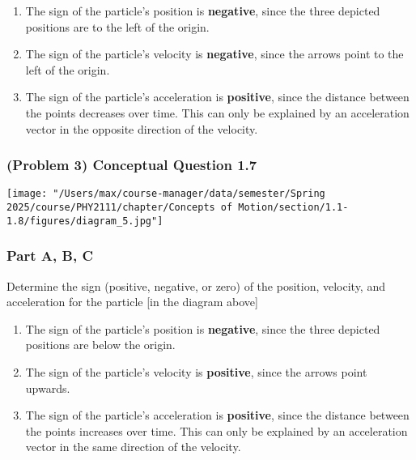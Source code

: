 \vspace{1em}

\begin{solution}
	\begin{enumerate}
		\item The sign of the particle's position is \textbf{negative}, since the three depicted positions are to the left of the origin.
		\item The sign of the particle's velocity is \textbf{negative}, since the arrows point to the left of the origin.
		\item The sign of the particle's acceleration is \textbf{positive}, since the distance between the points decreases over time. This can only be explained by an acceleration vector in the opposite direction of the velocity.
	\end{enumerate}
\end{solution}

\newpage

\subsubsection{(Problem 3) Conceptual Question 1.7}

\begin{center}
	\texttt{[image: "/Users/max/course-manager/data/semester/Spring 2025/course/PHY2111/chapter/Concepts of Motion/section/1.1-1.8/figures/diagram\_5.jpg"]}
\end{center}

\subsubsection{Part A, B, C}
Determine the sign (positive, negative, or zero) of the position, velocity, and acceleration for the particle [in the diagram above]

\vspace{1em}

\begin{solution}
	\begin{enumerate}
		\item The sign of the particle's position is \textbf{negative}, since the three depicted positions are below the origin.
		\item The sign of the particle's velocity is \textbf{positive}, since the arrows point upwards.
		\item The sign of the particle's acceleration is \textbf{positive}, since the distance between the points increases over time. This can only be explained by an acceleration vector in the same direction of the velocity.
	\end{enumerate}
\end{solution}

